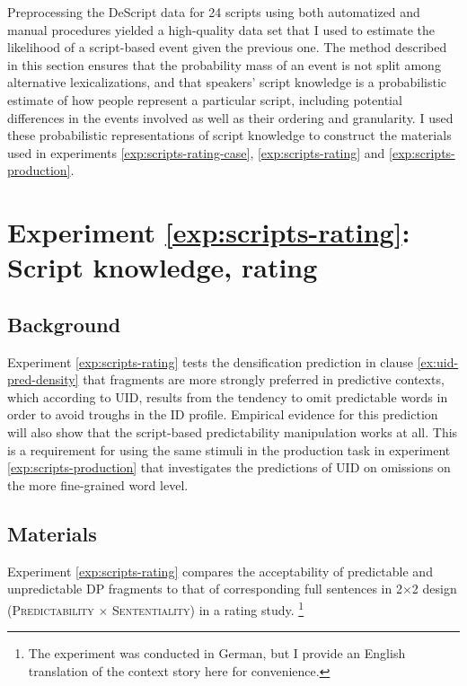 Preprocessing the DeScript data for 24 scripts using both automatized and manual procedures yielded a high-quality data set that I used to estimate the likelihood of a script-based event given the previous one. The method described in this section ensures that the probability mass of an event is not split among alternative lexicalizations, and that speakers' script knowledge is a probabilistic estimate of how people represent a particular script, including potential differences in the events involved as well as their ordering and granularity. I used these probabilistic representations of script knowledge to construct the materials used in experiments \ref{exp:scripts-rating-case}, \ref{exp:scripts-rating} and \ref{exp:scripts-production}.

\label{exp:scripts-rating}
\section{Experiment \ref{exp:scripts-rating}: Script knowledge, rating}  \label{sec:scripts-rating}

\subsection{Background}
Experiment \ref{exp:scripts-rating} tests the densification prediction in clause \ref{ex:uid-pred-density} that fragments are more strongly preferred in predictive contexts, which according to UID, results from the tendency to omit predictable words in order to avoid troughs in the ID profile. Empirical evidence for this prediction will also show that the script-based predictability manipulation works at all. This is a requirement for using the same stimuli in the production task in experiment \ref{exp:scripts-production} that investigates the predictions of UID on omissions on the more fine-grained word level. 

\subsection{Materials}\label{sec:scripts-rating-materials}

Experiment \ref{exp:scripts-rating} compares the acceptability of predictable and unpredictable DP fragments \Next[a,b] to that of corresponding full sentences \Next[c,d] in  2$\times$2 design (\textsc{Predictability} $\times$ \textsc{Sententiality}) in a rating study.%
%
\footnote{The experiment was conducted in German, but I provide an English translation of the context story here for convenience.}\afterfn%
%

